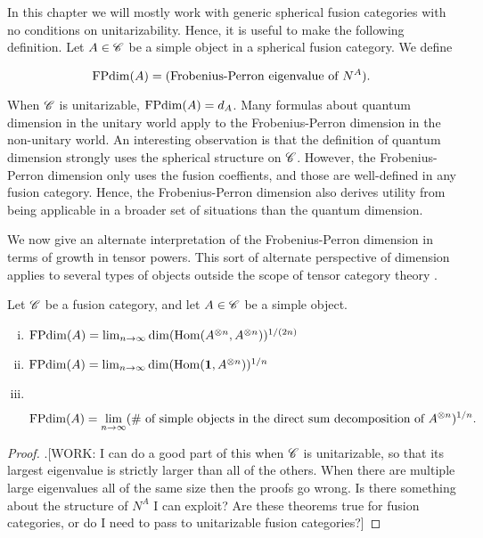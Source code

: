 In this chapter we will mostly work with generic spherical fusion categories with no conditions on unitarizability. Hence, it is useful to make the following definition. Let $A\in\mathscr{C}$ be a simple object in a spherical fusion category. We define

$$\operatorname{FPdim}(A)=(\text{Frobenius-Perron eigenvalue of $N^A$}).$$

When $\mathscr{C}$ is unitarizable, $\operatorname{FPdim}(A)=d_A$. Many formulas about quantum dimension in the unitary world apply to the Frobenius-Perron dimension in the non-unitary world. An interesting observation is that the definition of quantum dimension strongly uses the spherical structure on $\mathscr{C}$. However, the Frobenius-Perron dimension only uses the fusion coeffients, and those are well-defined in any fusion category. Hence, the Frobenius-Perron dimension also derives utility from being applicable in a broader set of situations than the quantum dimension.

We now give an alternate interpretation of the Frobenius-Perron dimension in terms of growth in tensor powers. This sort of alternate perspective of dimension applies to several types of objects outside the scope of tensor category theory \cite{coulembier2024growth}.

\begin{proposition} Let $\mathscr{C}$ be a fusion category, and let $A\in \mathscr{C}$ be a simple object.

\begin{enumerate}[(i)]
\item $\operatorname{FPdim}(A)=\lim_{n\to\infty}\dim(\operatorname{Hom}(A^{\otimes n},A^{\otimes n}))^{1/(2n)}$
\item $\operatorname{FPdim}(A)=\lim_{n\to\infty}\dim(\operatorname{Hom}(\mathbf{1},A^{\otimes n}))^{1/n}$
\item $\,$

$$\operatorname{FPdim}(A)=\lim_{n\to\infty}(\text{\# of simple objects in the direct sum decomposition of $A^{\otimes n}$})^{1/n}.$$
\end{enumerate}
\end{proposition}
\begin{proof}.[WORK: I can do a good part of this when $\mathscr{C}$ is unitarizable, so that its largest eigenvalue is strictly larger than all of the others. When there are multiple large eigenvalues all of the same size then the proofs go wrong. Is there something about the structure of $N^A$ I can exploit? Are these theorems true for fusion categories, or do I need to pass to unitarizable fusion categories?]
\end{proof}

